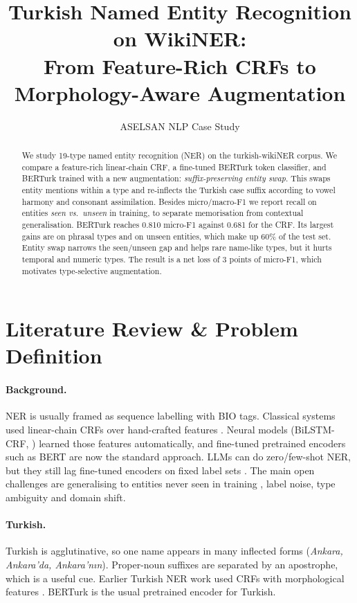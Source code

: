 \documentclass[11pt]{article}
\title{Turkish Named Entity Recognition on WikiNER:\\From Feature-Rich CRFs to Morphology-Aware Augmentation}
\author{ASELSAN NLP Case Study}
\begin{document}
\maketitle

\begin{abstract}
We study 19-type named entity recognition (NER) on the turkish-wikiNER corpus. We compare a feature-rich linear-chain CRF, a fine-tuned BERTurk token classifier, and BERTurk trained with a new augmentation: \emph{suffix-preserving entity swap}. This swaps entity mentions within a type and re-inflects the Turkish case suffix according to vowel harmony and consonant assimilation. Besides micro/macro-F1 we report recall on entities \emph{seen vs.\ unseen} in training, to separate memorisation from contextual generalisation. BERTurk reaches 0.810 micro-F1 against 0.681 for the CRF. Its largest gains are on phrasal types and on unseen entities, which make up 60\% of the test set. Entity swap narrows the seen/unseen gap and helps rare name-like types, but it hurts temporal and numeric types. The result is a net loss of 3 points of micro-F1, which motivates type-selective augmentation.
\end{abstract}

\section{Literature Review \& Problem Definition}
\paragraph{Background.}
NER is usually framed as sequence labelling with BIO tags. Classical systems used linear-chain CRFs over hand-crafted features \citep{lafferty2001crf}. Neural models (BiLSTM-CRF, \citealp{lample2016neural}) learned those features automatically, and fine-tuned pretrained encoders such as BERT \citep{devlin2019bert} are now the standard approach. LLMs can do zero/few-shot NER, but they still lag fine-tuned encoders on fixed label sets \citep{han2023ie}. The main open challenges are generalising to entities never seen in training \citep{augenstein2017generalisation}, label noise, type ambiguity and domain shift.

\paragraph{Turkish.}
Turkish is agglutinative, so one name appears in many inflected forms (\textit{Ankara, Ankara'da, Ankara'nın}). Proper-noun suffixes are separated by an apostrophe, which is a useful cue. Earlier Turkish NER work used CRFs with morphological features \citep{seker2012initial}. BERTurk \citep{schweter2020berturk} is the usual pretrained encoder for Turkish.
\end{document}
